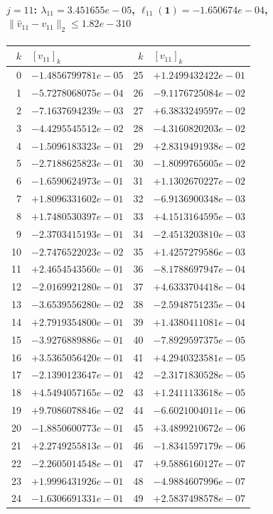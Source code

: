 \paragraph{$j = 11$: $\lambda_{11} = 3.451655e-05$, \quad $\ell_{11}(\mathbf{1}) = -1.650674e-04$, \quad $\|\hat{v}_{11} - v_{11}\|_2 \leq 1.82e-310$}
\begin{center}
{\footnotesize
\begin{tabular}{r@{\;\;}l@{\quad}r@{\;\;}l}
\toprule
$k$ & $[v_{11}]_k$ & $k$ & $[v_{11}]_k$ \\
\midrule
0 & $-1.4856799781e-05$ & 25 & $+1.2499432422e-01$ \\
1 & $-5.7278068075e-04$ & 26 & $-9.1176725084e-02$ \\
2 & $-7.1637694239e-03$ & 27 & $+6.3833249597e-02$ \\
3 & $-4.4295545512e-02$ & 28 & $-4.3160820203e-02$ \\
4 & $-1.5096183323e-01$ & 29 & $+2.8319491938e-02$ \\
5 & $-2.7188625823e-01$ & 30 & $-1.8099765605e-02$ \\
6 & $-1.6590624973e-01$ & 31 & $+1.1302670227e-02$ \\
7 & $+1.8096331602e-01$ & 32 & $-6.9136900348e-03$ \\
8 & $+1.7480530397e-01$ & 33 & $+4.1513164595e-03$ \\
9 & $-2.3703415193e-01$ & 34 & $-2.4513203810e-03$ \\
10 & $-2.7476522023e-02$ & 35 & $+1.4257279586e-03$ \\
11 & $+2.4654543560e-01$ & 36 & $-8.1788697947e-04$ \\
12 & $-2.0169921280e-01$ & 37 & $+4.6333704418e-04$ \\
13 & $-3.6539556280e-02$ & 38 & $-2.5948751235e-04$ \\
14 & $+2.7919354800e-01$ & 39 & $+1.4380411081e-04$ \\
15 & $-3.9276889886e-01$ & 40 & $-7.8929597375e-05$ \\
16 & $+3.5365056420e-01$ & 41 & $+4.2940323581e-05$ \\
17 & $-2.1390123647e-01$ & 42 & $-2.3171830528e-05$ \\
18 & $+4.5494057165e-02$ & 43 & $+1.2411133618e-05$ \\
19 & $+9.7086078846e-02$ & 44 & $-6.6021004011e-06$ \\
20 & $-1.8850600773e-01$ & 45 & $+3.4899210672e-06$ \\
21 & $+2.2749255813e-01$ & 46 & $-1.8341597179e-06$ \\
22 & $-2.2605014548e-01$ & 47 & $+9.5886160127e-07$ \\
23 & $+1.9996431926e-01$ & 48 & $-4.9884607996e-07$ \\
24 & $-1.6306691331e-01$ & 49 & $+2.5837498578e-07$ \\
\bottomrule
\end{tabular}
}
\end{center}


